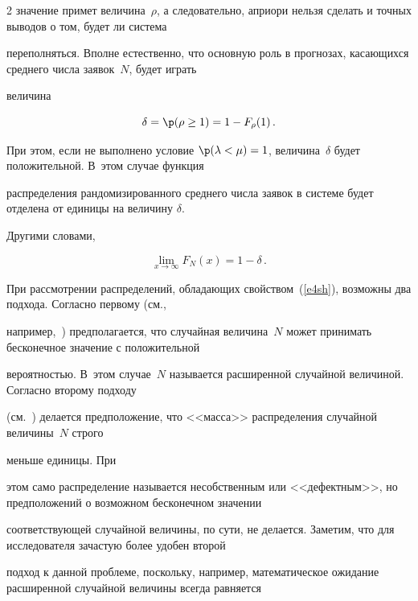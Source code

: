 \begin{multicols}{2}
значение примет величина~$\rho$, а следовательно, априори нельзя сделать и точных выводов о том, будет ли система


переполняться. Вполне естественно, что основную роль в прогнозах, касающихся среднего числа заявок~$N$, будет играть


величина


\begin{equation}


\delta=\p(\rho\ge1)=1-F_\rho(1)\,.


\label{e3sh}


\end{equation}


При этом, если не выполнено условие $\p(\lambda<\mu)=1$, величина~$\delta$ будет положительной. В~этом случае функция


распределения рандомизированного среднего числа заявок в системе будет отделена от единицы на величину $\delta$.


Другими словами,


\begin{equation}


\lim_{x\to\infty}F_N(x)=1-\delta\,.


\label{e4sh}


\end{equation}





При рассмотрении распределений, обладающих свойством~(\ref{e4sh}), возможны два подхода. Согласно первому (см., 


например,~\cite{Shiryaev80}) предполагается, что случайная величина~$N$ может принимать бесконечное значение с положительной


вероятностью. В~этом случае~$N$ называется расширенной случайной величиной. Согласно второму подходу 


(см.~\cite{Feller67}) делается предположение, что <<масса>> распределения случайной величины~$N$ строго 


меньше единицы. При


этом само распределение называется несобственным или <<дефектным>>, но предположений о возможном бесконечном значении


соответствующей случайной величины, по сути, не делается. Заметим, что для исследователя зачастую более удобен второй


подход к данной проблеме, поскольку, например, математическое ожидание расширенной случайной величины всегда равняется



\end{multicols}
